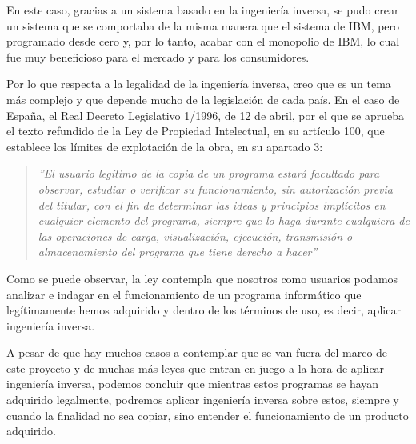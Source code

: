 En este caso, gracias a un sistema basado en la ingeniería inversa, se pudo crear un sistema que se comportaba
de la misma manera que el sistema de IBM, pero programado desde cero y, por lo tanto, acabar con el monopolio
de IBM, lo cual fue muy beneficioso para el mercado y para los consumidores. \cite{IngenieriaInversa}

Por lo que respecta a la legalidad de la ingeniería inversa, creo que es un tema más complejo y que depende
mucho de la legislación de cada país. En el caso de España, el Real Decreto Legislativo 1/1996, de 12 de abril,
por el que se aprueba el texto refundido de la Ley de Propiedad Intelectual, en su artículo 100, que establece
los límites de explotación de la obra, en su apartado 3:

\begin{quote}
\textit{''El usuario legítimo de la copia de un programa estará facultado para observar, estudiar o
verificar su funcionamiento, sin autorización previa del titular, con el fin de determinar las ideas
y principios implícitos en cualquier elemento del programa, siempre que lo haga durante cualquiera de
las operaciones de carga, visualización, ejecución, transmisión o almacenamiento del programa que tiene
derecho a hacer\cite{LeyPropiedadIntelectual}''}
\end{quote}

Como se puede observar, la ley contempla que nosotros como usuarios podamos analizar e indagar en el funcionamiento
de un programa informático que legítimamente hemos adquirido y dentro de los términos de uso, es decir, aplicar
ingeniería inversa.

A pesar de que hay muchos casos a contemplar que se van fuera del marco de este proyecto y de muchas más leyes
que entran en juego a la hora de aplicar ingeniería inversa, podemos concluir que mientras estos programas se hayan
adquirido legalmente, podremos aplicar ingeniería inversa sobre estos, siempre y cuando la finalidad no sea copiar,
sino entender el funcionamiento de un producto adquirido.
